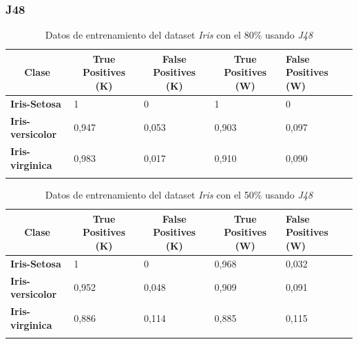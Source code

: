 \documentclass[10pt,a4paper]{article}
\begin{document}
\subsubsection{J48}
\begin{table}[h!]
	\begin{tabular}{lllll}
		\hline
		\multicolumn{1}{|c|}{\textbf{Clase}} & \multicolumn{1}{c|}{\textbf{True Positives (K)}} & \multicolumn{1}{c|}{\textbf{False Positives (K)}} & \multicolumn{1}{c|}{\textbf{True Positives (W)}} & \multicolumn{1}{l|}{\textbf{False Positives (W)}} \\ \hline
		\multicolumn{1}{|l|}{\textbf{Iris-Setosa}} & \multicolumn{1}{l|}{1}          & \multicolumn{1}{l|}{0}          & \multicolumn{1}{l|}{1}          & \multicolumn{1}{l|}{0} \\ \hline
		\multicolumn{1}{|l|}{\textbf{Iris-versicolor}} & \multicolumn{1}{l|}{0,947}          & \multicolumn{1}{l|}{0,053}          & \multicolumn{1}{l|}{0,903}          & \multicolumn{1}{l|}{0,097} \\ \hline
		\multicolumn{1}{|l|}{\textbf{Iris-virginica}} & \multicolumn{1}{l|}{0,983}          & \multicolumn{1}{l|}{0,017}          & \multicolumn{1}{l|}{0,910}          & \multicolumn{1}{l|}{0,090}\\ \hline
		\textbf{}                       &                                &                                &                                &                      
		
	\end{tabular}
	\caption{Datos de entrenamiento del dataset \emph{Iris} con el 80\% usando \emph{J48}}
	\label{tab:iris_j48_80}
\end{table}

\begin{table}[h!]
	\begin{tabular}{lllll}
		\hline
		\multicolumn{1}{|c|}{\textbf{Clase}} & \multicolumn{1}{c|}{\textbf{True Positives (K)}} & \multicolumn{1}{c|}{\textbf{False Positives (K)}} & \multicolumn{1}{c|}{\textbf{True Positives (W)}} & \multicolumn{1}{l|}{\textbf{False Positives (W)}} \\ \hline
		\multicolumn{1}{|l|}{\textbf{Iris-Setosa}} & \multicolumn{1}{l|}{1}          & \multicolumn{1}{l|}{0}          & \multicolumn{1}{l|}{0,968}          & \multicolumn{1}{l|}{0,032} \\ \hline
		\multicolumn{1}{|l|}{\textbf{Iris-versicolor}} & \multicolumn{1}{l|}{0,952}          & \multicolumn{1}{l|}{0,048}          & \multicolumn{1}{l|}{0,909}          & \multicolumn{1}{l|}{0,091} \\ \hline
		\multicolumn{1}{|l|}{\textbf{Iris-virginica}} & \multicolumn{1}{l|}{0,886}          & \multicolumn{1}{l|}{0,114}          & \multicolumn{1}{l|}{0,885}          & \multicolumn{1}{l|}{0,115}\\ \hline
		\textbf{}                       &                                &                                &                                &                      
		
	\end{tabular}
	\caption{Datos de entrenamiento del dataset \emph{Iris} con el 50\% usando \emph{J48}}
	\label{tab:iris_j48_50}
\end{table}
\end{document}
